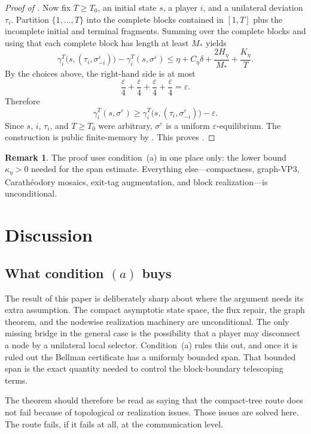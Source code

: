 \documentclass[12pt]{article}
\theoremstyle{definition}
\newtheorem{remark}[theorem]{Remark}
\newcommand{\eps}{\varepsilon}
\newcommand{\1}{\mathbf{1}}
\begin{document}
\begin{proof}[Proof of ]
Now fix \(T\ge T_0\), an initial state \(s\), a player \(i\), and a unilateral deviation
\(\tau_i\).  Partition \(\{1,\dots,T\}\) into the complete blocks contained in \([1,T]\)
plus the incomplete initial and terminal fragments.  Summing
 over the complete blocks and using that each complete block has
length at least \(M_*\) yields
\[
\gamma_i^T\bigl(s,(\tau_i,\sigma^\eps_{-i})\bigr)
-
\gamma_i^T(s,\sigma^\eps)
\le
\eta + C_\eta\delta + \frac{2H_\eta}{M_*} + \frac{K_\eta}{T}.
\]
By the choices above, the right-hand side is at most
\[
\frac{\eps}{4}+\frac{\eps}{4}+\frac{\eps}{4}+\frac{\eps}{4}=\eps.
\]
Therefore
\[
\gamma_i^T(s,\sigma^\eps)
\ge
\gamma_i^T\bigl(s,(\tau_i,\sigma^\eps_{-i})\bigr)-\eps.
\]
Since \(s\), \(i\), \(\tau_i\), and \(T\ge T_0\) were arbitrary, \(\sigma^\eps\) is a
uniform \(\eps\)-equilibrium.  The construction is public finite-memory by
.  This proves .
\end{proof}

\begin{remark}
The proof uses condition~(a) in one place only: the lower bound \(\kappa_\eta>0\) needed
for the span estimate.  Everything else---compactness, graph-VP3, Carath\'eodory mosaics,
exit-tag augmentation, and block realization---is unconditional.
\end{remark}

\section{Discussion}
\label{sec:discussion}

\subsection{What condition \texorpdfstring{$(a)$}{(a)} buys}

The result of this paper is deliberately sharp about where the argument needs its extra
assumption.  The compact asymptotic state space, the flux repair, the graph theorem, and
the nodewise realization machinery are unconditional.  The only missing bridge in the
general case is the possibility that a player may disconnect a node by a unilateral local
selector.  Condition~(a) rules this out, and once it is ruled out the Bellman certificate
has a uniformly bounded span.  That bounded span is the exact quantity needed to control
the block-boundary telescoping terms.

The theorem should therefore be read as saying that the compact-tree route does not fail
because of topological or realization issues.  Those issues are solved here.  The route
fails, if it fails at all, at the communication level.
\end{document}

